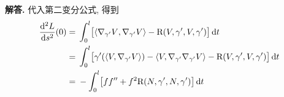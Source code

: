 \documentclass{ctexart}
\newenvironment{solution}{\par\noindent\textbf{解答. }}{\par}
\begin{document}
\begin{solution}
    代入第二变分公式, 得到
    \[
        \begin{aligned}
            \dfrac{\mathop{}\!\mathrm{d} ^2 L}{\mathop{}\!\mathrm{d} s^2}(0) ={} & \int_{0}^{l} \bigl[\langle {\nabla_{\gamma^{\prime}}V}, {\nabla_{\gamma^{\prime}}V} \rangle - \mathrm{R}(V, \gamma^{\prime}, V, \gamma^{\prime})\bigr] \mathop{}\!\mathrm{d} t \\
            ={} & \int_{0}^{l} \bigl[\gamma^{\prime}(\langle {V}, {\nabla_{\gamma^{\prime}}V} \rangle) - \langle {V}, {\nabla_{\gamma^{\prime}}\nabla_{\gamma^{\prime}}V} \rangle - \mathrm{R}(V, \gamma^{\prime}, V, \gamma^{\prime})\bigr] \mathop{}\!\mathrm{d} t \\
            ={} & -\int_{0}^{l} \bigl[ff^{\prime\prime} + f^2 \mathrm{R}(N, \gamma^{\prime}, N, \gamma^{\prime})\bigr] \mathop{}\!\mathrm{d} t
        \end{aligned}
    \]
\end{solution}
\end{document}
